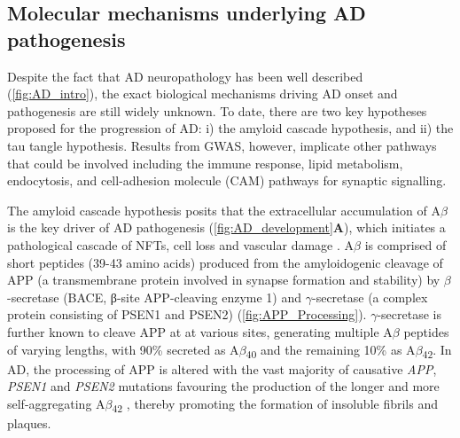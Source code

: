\subsection{Molecular mechanisms underlying AD pathogenesis}
\label{aetiologyAD}
Despite the fact that AD neuropathology has been well described (\cref{fig:AD_intro}), the exact biological mechanisms driving AD onset and pathogenesis are still widely unknown. To date, there are two key hypotheses proposed for the progression of AD: i) the amyloid cascade hypothesis, and ii) the tau tangle hypothesis. Results from GWAS, however, implicate other pathways that could be involved including the immune response, lipid metabolism, endocytosis, and cell-adhesion molecule (CAM) pathways for synaptic signalling.  

The amyloid cascade hypothesis posits that the extracellular accumulation of A$\beta$ is the key driver of AD pathogenesis (\cref{fig:AD_development}\textbf{A}), which initiates a pathological cascade of NFTs, cell loss and vascular damage \cite{Hardy1992}. A$\beta$ is comprised of short peptides (39-43 amino acids) \cite{J1987} produced from the amyloidogenic cleavage of APP (a transmembrane protein involved in synapse formation and stability) by $\beta$-secretase (BACE, β-site APP-cleaving enzyme 1) and $\gamma$-secretase (a complex protein consisting of PSEN1 and PSEN2) (\cref{fig:APP_Processing}).  $\gamma$-secretase is further known to cleave APP at at various sites, generating multiple A$\beta$ peptides of varying lengths, with 90\% secreted as A$\beta$\textsubscript{40} and the remaining 10\% as A$\beta$\textsubscript{42}\cite{Asami-Odaka1995}. In AD, the processing of APP is altered with the vast majority of causative \textit{APP}, \textit{PSEN1} and \textit{PSEN2} mutations favouring the production of the longer and more self-aggregating A$\beta$\textsubscript{42} \cite{Li2019,D1996,JT1993}, thereby promoting the formation of insoluble fibrils and plaques\cite{JT1993}. 

